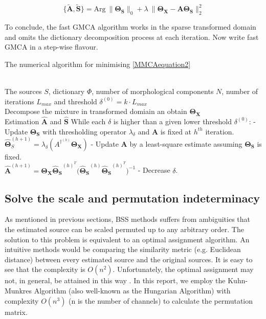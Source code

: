 \begin{equation}
    \{\mathbf{\tilde{A},\tilde{S}}\} = \text{Arg} \: 
    \lVert \mathbf{\Theta_S} \rVert_0 + \lambda \:\lVert \mathbf{\Theta_X} - \mathbf{A\Theta_S} \rVert^2_2
\label{fast-gmca}
\end{equation}

To conclude, the fast GMCA algorithm works in the sparse transformed domain and omits the dictionary decomposition process at each iteration. Now write fast GMCA in a step-wise flavour.

\begin{algorithm}[H] 
\caption{ The numerical algorithm for minimising \ref{MMCAequation2}} 
\label{alg:Framwork} 
\begin{algorithmic}
\REQUIRE ~~\\%
The sources $S$, dictionary $\Phi$, number of morphological components $N$, number of iterations $L_{max}$ and threshold $\delta^{(0)} = k \cdot L_{max}$
\ENSURE ~~\\ %
Decompose the mixture in transformed domiain an obtain $\mathbf{\Theta_X}$\\
Estimation $\hat{\mathbf{A}}$ and $\hat{\mathbf{S}}$
\STATE While each $\delta$ is higher than a given lower threshold $\delta^{(0)}$:
\STATE \quad - Update $\mathbf{\Theta_S}$ with thresholding operator $\lambda_{\delta}$ and $\mathbf{A}$ is fixed at $h^{th}$ iteration.\\
\quad \quad $\mathbf{\hat{\Theta}}^{(h+1)}_S = \lambda_{\delta} (A^{\dagger^{(h)}}\mathbf{\Theta_X})$
\STATE \quad - Update $\mathbf{A}$ by a least-square estimate assuming $\mathbf{\Theta_S}$ is fixed.\\
\quad \quad $\mathbf{\hat{A}}^{(h+1)} = \mathbf{\Theta_X} \mathbf{\hat{\Theta}_S}^{(h)^T} 
\mathbf{(\hat{\Theta}_S}^{(h)} \mathbf{\hat{\Theta}_S}^{(h)^T})^{-1}$
\STATE \quad - Decrease $\delta$.
\end{algorithmic}
\end{algorithm}


\subsection{Solve the scale and permutation indeterminacy}
As mentioned in previous sections, BSS methods suffers from ambiguities that the estimated source can be scaled permuted up to any arbitrary order. The solution to this problem is equivalent to an optimal assignment algorithm. An intuitive methods would be comparing the similarity metric (e.g. Euclidean distance) between every estimated source and the original sources. It is easy to see that the complexity is $O(n^2)$. Unfortunately, the optimal assignment may not, in general, be attained in this way \cite{1261953}. In this report, we employ the Kuhn-Munkres Algorithm (also well-known as the Hungarian Algorithm)
with complexity $O(n^3)$ (n is the number of channels) to calculate the permutation matrix.






